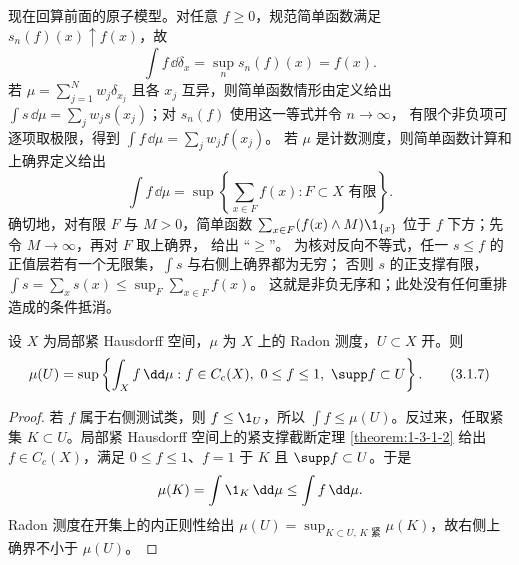 现在回算前面的原子模型。对任意 $f\geq0$，规范简单函数满足
$s_n(f)(x)\uparrow f(x)$，故
\[
 \int f\,\dd\delta_x=\sup_ns_n(f)(x)=f(x).
\]
若 $\mu=\sum_{j=1}^Nw_j\delta_{x_j}$ 且各 $x_j$ 互异，则简单函数情形由定义给出
$\int s\,\dd\mu=\sum_jw_js(x_j)$；对 $s_n(f)$ 使用这一等式并令 $n\to\infty$，
有限个非负项可逐项取极限，得到
$\int f\,\dd\mu=\sum_jw_jf(x_j)$。
若 $\mu$ 是计数测度，则简单函数计算和上确界定义给出
\[
 \int f\,\dd\mu
 =\sup\left\{\sum_{x\in F}f(x):F\subset X\text{ 有限}\right\}.
\]
确切地，对有限 $F$ 与 $M>0$，简单函数
$\sum_{x\in F}(f(x)\wedge M)\1_{\{x\}}$ 位于 $f$ 下方；先令 $M\to\infty$，再对 $F$ 取上确界，
给出 ``$\geq$''。
为核对反向不等式，任一 $s\leq f$ 的正值层若有一个无限集，$\int s$ 与右侧上确界都为无穷；
否则 $s$ 的正支撑有限，$\int s=\sum_xs(x)\leq\sup_F\sum_{x\in F}f(x)$。
这就是非负无序和；此处没有任何重排造成的条件抵消。

\begin{theorem}\label{theorem:3-1-1-4}
设 $X$ 为局部紧 Hausdorff 空间，$\mu$ 为 $X$ 上的 Radon 测度，$U\subset X$ 开。则
\[
 \mu(U)=\sup\left\{\int_X f\,\dd\mu:
 f\in C_c(X),\ 0\leq f\leq1,\ \supp f\subset U\right\}.
 \tag{3.1.7}\label{eq:3-1-radon-open}
\]
\end{theorem}

\begin{proof}
若 $f$ 属于右侧测试类，则 $f\leq\1_U$，所以
$\int f\leq\mu(U)$。反过来，任取紧集 $K\subset U$。局部紧 Hausdorff 空间上的紧支撑截断定理
\ref{theorem:1-3-1-2} 给出 $f\in C_c(X)$，满足
$0\leq f\leq1$、$f=1$ 于 $K$ 且 $\supp f\subset U$。于是
\[
 \mu(K)=\int\1_K\,\dd\mu\leq\int f\,\dd\mu.
\]
Radon 测度在开集上的内正则性给出
$\mu(U)=\sup_{K\subset U,\,K\text{ 紧}}\mu(K)$，故右侧上确界不小于 $\mu(U)$。
\end{proof}

